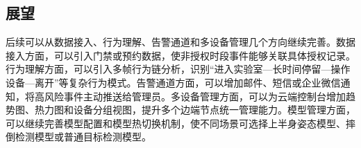 \subsection{展望}

后续可以从数据接入、行为理解、告警通道和多设备管理几个方向继续完善。数据接入方面，可以引入门禁或预约数据，使非授权时段事件能够关联具体授权记录。行为理解方面，可以引入多帧行为链分析，识别“进入实验室—长时间停留—操作设备—离开”等复杂行为模式。告警通道方面，可以增加邮件、短信或企业微信通知，将高风险事件主动推送给管理员。多设备管理方面，可以为云端控制台增加趋势图、热力图和设备分组视图，提升多个边端节点统一管理能力。模型管理方面，可以继续完善模型配置和模型热切换机制，使不同场景可选择上半身姿态模型、摔倒检测模型或普通目标检测模型。

